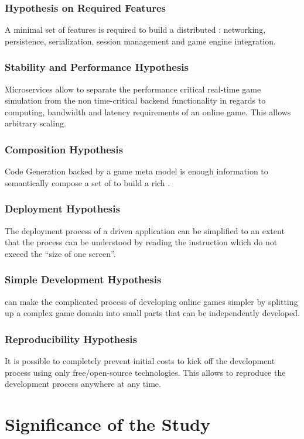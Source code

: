 \subsubsection{Hypothesis on Required Features}
A minimal set of features is required to build a distributed \og{}: networking,
persistence, serialization, session management and game engine integration.

\subsubsection{Stability and Performance Hypothesis} 
Microservices allow to separate the performance critical real-time game
simulation from the non time-critical backend functionality in regards to
computing, bandwidth and latency requirements of an online game. This allows
arbitrary scaling.

\subsubsection{Composition Hypothesis}
Code Generation backed by a game meta model is enough information to
semantically compose a set of \mss{} to build a rich \og{}.

\subsubsection{Deployment Hypothesis}
The deployment process of a \ms{} driven \og{} application can be simplified to
an extent that the process can be understood by reading the instruction which
do not exceed the ``size of one screen''.

\subsubsection{Simple Development Hypothesis} 
\mss{} can make the complicated process of developing online games simpler
by splitting up a complex game domain into small parts that can be independently
developed.

\subsubsection{Reproducibility Hypothesis} 
It is possible to completely prevent initial costs to kick off the development
process using only free/open-source technologies. This allows to reproduce the
development process anywhere at any time.

\section{Significance of the Study}


